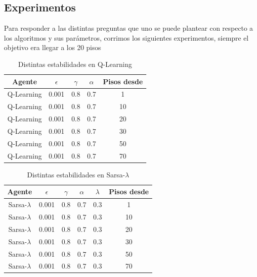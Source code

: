 \documentclass[11pt, a4paper]{article}
\newcommand{\slambda}{Sarsa-$\lambda$ }
\begin{document}
\newpage

\subsection{Experimentos}

Para responder a las distintas preguntas que uno se puede plantear con respecto a los algoritmos y sus par\'ametros, corrimos los siguientes experimentos, siempre el objetivo era llegar a los 20 pisos

\bigskip

\begin{table}[h!]
\center
\begin{tabular}{ | c | c | c | c | c| }
  \hline
  Agente & $\epsilon$ & $\gamma$ & $\alpha$ & Pisos desde \\
  \hline 
 	 Q-Learning  & 0.001  & 0.8  & 0.7 & 1 \\
	Q-Learning  & 0.001  & 0.8  & 0.7 &  10\\
	Q-Learning  & 0.001  & 0.8  & 0.7 &  20 \\
	Q-Learning  & 0.001  & 0.8  & 0.7 &  30\\
	Q-Learning  & 0.001  & 0.8  & 0.7 &  50\\
	Q-Learning  & 0.001  & 0.8  & 0.7 &  70\\
  \hline

\end{tabular}
\caption {Distintas estabilidades en Q-Learning}
\end{table}

\begin{table}[h!]
\center
\begin{tabular}{ | c | c | c | c | c | c | }
  \hline
  Agente & $\epsilon$ & $\gamma$ & $\alpha$ & $\lambda$ & Pisos desde \\
  \hline 
 	 \slambda  & 0.001  & 0.8  & 0.7 & 0.3 & 1 \\
	\slambda  & 0.001  & 0.8  & 0.7 &  0.3& 10 \\
	\slambda  & 0.001  & 0.8  & 0.7 &  0.3& 20  \\
	\slambda  & 0.001  & 0.8  & 0.7 &  0.3& 30 \\
	\slambda  & 0.001  & 0.8  & 0.7 &  0.3& 50 \\
	\slambda  & 0.001  & 0.8  & 0.7 &  0.3& 70 \\
  \hline

\end{tabular}
\caption {Distintas estabilidades en \slambda}
\end{table}
\end{document}
